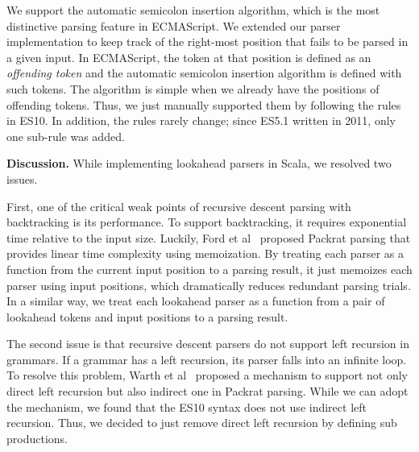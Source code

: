 We support the automatic semicolon insertion algorithm, which
is the most distinctive parsing feature in ECMAScript.  We extended
our parser implementation to keep track of the right-most position
that fails to be parsed in a given input.  In ECMAScript, the token at that
position is defined as an \textit{offending token} and the automatic
semicolon insertion algorithm is defined with such tokens.  The
algorithm is simple when we already have the positions of offending
tokens.  Thus, we just manually supported them by following the rules
in ES10.  In addition, the rules rarely change; since
ES5.1 written in 2011, only one sub-rule was added.

\smallskip

\textbf{Discussion.}
While implementing lookahead parsers in Scala, we resolved two issues.

First, one of the critical weak points of recursive descent parsing
with backtracking is its performance.  To support backtracking, it
requires exponential time relative to the input size.  Luckily, Ford
et al~\cite{packrat} proposed Packrat parsing that provides linear 
time complexity using memoization.  By treating each parser as a
function from the current input position to a parsing result, it just
memoizes each parser using input positions, which dramatically reduces
redundant parsing trials.  In a similar way, we treat each lookahead
parser as a function from a pair of lookahead tokens and input
positions to a parsing result.

The second issue is that recursive descent parsers do not support left
recursion in grammars.  If a grammar has a left recursion, its parser
falls into an infinite loop.  To resolve this problem, Warth et
al~\cite{packrat-lr} proposed a mechanism to support not only direct
left recursion but also indirect one in Packrat parsing.  While we can
adopt the mechanism, we found that the ES10 syntax does not
use indirect left recursion.  Thus, we decided to just remove direct
left recursion by defining sub productions.
